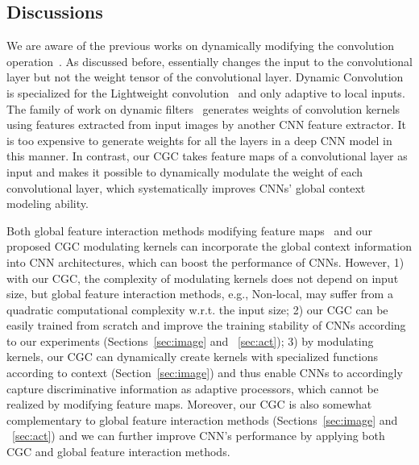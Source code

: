 \documentclass[runningheads]{llncs}
\begin{document}
\subsection{Discussions}
We are aware of the previous works on dynamically modifying the convolution operation~\cite{dai2017deformable,wu2019pay,jia2016dynamic,jo2018deep,mildenhall2018burst,zhu2019deformable}. As discussed before, \cite{zhu2019deformable} essentially changes the input to the convolutional layer but not the weight tensor of the convolutional layer. Dynamic Convolution~\cite{wu2019pay} is specialized for the Lightweight convolution~\cite{wu2019pay} and only adaptive to local inputs. The family of work on dynamic filters~\cite{jia2016dynamic,jo2018deep,mildenhall2018burst} generates weights of convolution kernels using features extracted from input images by another CNN feature extractor. It is too expensive to generate weights for all the layers in a deep CNN model in this manner. In contrast, our CGC takes feature maps of a convolutional layer as input and makes it possible to dynamically modulate the weight of each convolutional layer, which systematically improves CNNs' global context modeling ability.

Both global feature interaction methods\cite{vaswani2017attention,wang2017residual,wang2017non,park2018bam,hu2018squeeze,chen2019graph,cao2019gcnet,bello2019attention} modifying feature maps~ and our proposed CGC modulating kernels can incorporate the global context information into CNN architectures, which can boost the performance of CNNs. However, 1) with our CGC, the complexity of modulating kernels does not depend on input size, but global feature interaction methods, e.g., Non-local, may suffer from a quadratic computational complexity w.r.t. the input size; 2) our CGC can be easily trained from scratch and improve the training stability of CNNs according to our experiments (Sections~\ref{sec:image} and ~\ref{sec:act}); 3) by modulating kernels, our CGC can dynamically create kernels with specialized functions according to context (Section~\ref{sec:image}) and thus enable CNNs to accordingly capture discriminative information as adaptive processors, which cannot be realized by modifying feature maps. Moreover, our CGC is also somewhat complementary to global feature interaction methods (Sections~\ref{sec:image} and ~\ref{sec:act}) and we can further improve CNN's performance by applying both CGC and global feature interaction methods.
\end{document}
